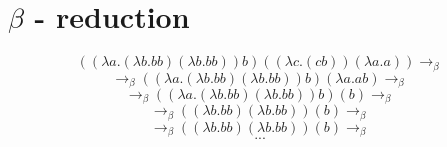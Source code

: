 \documentclass[12pt]{article}
\begin{document}
\section*{\ensuremath{\beta} - reduction}
\[  (({\lambda} a.({\lambda} b.bb)({\lambda} b.bb))b)(({\lambda} c.(cb))({\lambda} a.a))  \rightarrow_{\beta}\]
\[  \rightarrow_{\beta} (({\lambda} a.({\lambda} b.bb)({\lambda} b.bb))b)({\lambda} a. a b) \rightarrow_{\beta}\]
\[  \rightarrow_{\beta} (({\lambda} a.({\lambda} b.bb)({\lambda} b.bb))b)(b) \rightarrow_{\beta}\]
\[  \rightarrow_{\beta} (({\lambda} b.bb)({\lambda} b.bb))(b) \rightarrow_{\beta}\]
\[  \rightarrow_{\beta} (({\lambda} b.bb)({\lambda} b.bb))(b) \rightarrow_{\beta}\]
\[ ... \]
\end{document}

